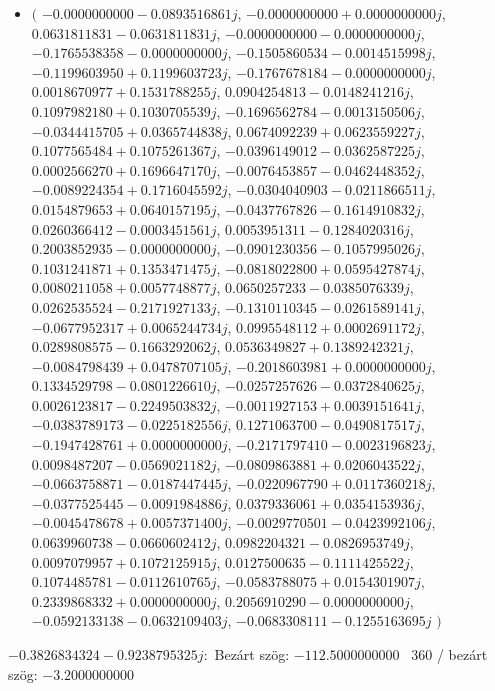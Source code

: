 \documentclass[14pt,a4paper]{article}
\begin{document}
\begin{itemize}
\item
$\big($
$-0.0000000000-0.0893516861j$, $-0.0000000000+0.0000000000j$, $0.0631811831-0.0631811831j$, $-0.0000000000-0.0000000000j$, $-0.1765538358-0.0000000000j$, $-0.1505860534-0.0014515998j$, $-0.1199603950+0.1199603723j$, $-0.1767678184-0.0000000000j$, $0.0018670977+0.1531788255j$, $0.0904254813-0.0148241216j$, $0.1097982180+0.1030705539j$, $-0.1696562784-0.0013150506j$, $-0.0344415705+0.0365744838j$, $0.0674092239+0.0623559227j$, $0.1077565484+0.1075261367j$, $-0.0396149012-0.0362587225j$, $0.0002566270+0.1696647170j$, $-0.0076453857-0.0462448352j$, $-0.0089224354+0.1716045592j$, $-0.0304040903-0.0211866511j$, $0.0154879653+0.0640157195j$, $-0.0437767826-0.1614910832j$, $0.0260366412-0.0003451561j$, $0.0053951311-0.1284020316j$, $0.2003852935-0.0000000000j$, $-0.0901230356-0.1057995026j$, $0.1031241871+0.1353471475j$, $-0.0818022800+0.0595427874j$, $0.0080211058+0.0057748877j$, $0.0650257233-0.0385076339j$, $0.0262535524-0.2171927133j$, $-0.1310110345-0.0261589141j$, $-0.0677952317+0.0065244734j$, $0.0995548112+0.0002691172j$, $0.0289808575-0.1663292062j$, $0.0536349827+0.1389242321j$, $-0.0084798439+0.0478707105j$, $-0.2018603981+0.0000000000j$, $0.1334529798-0.0801226610j$, $-0.0257257626-0.0372840625j$, $0.0026123817-0.2249503832j$, $-0.0011927153+0.0039151641j$, $-0.0383789173-0.0225182556j$, $0.1271063700-0.0490817517j$, $-0.1947428761+0.0000000000j$, $-0.2171797410-0.0023196823j$, $0.0098487207-0.0569021182j$, $-0.0809863881+0.0206043522j$, $-0.0663758871-0.0187447445j$, $-0.0220967790+0.0117360218j$, $-0.0377525445-0.0091984886j$, $0.0379336061+0.0354153936j$, $-0.0045478678+0.0057371400j$, $-0.0029770501-0.0423992106j$, $0.0639960738-0.0660602412j$, $0.0982204321-0.0826953749j$, $0.0097079957+0.1072125915j$, $0.0127500635-0.1111425522j$, $0.1074485781-0.0112610765j$, $-0.0583788075+0.0154301907j$, $0.2339868332+0.0000000000j$, $0.2056910290-0.0000000000j$, $-0.0592133138-0.0632109403j$, $-0.0683308111-0.1255163695j$
$\big)$
\end{itemize}
$-0.3826834324-0.9238795325j$:\
Bezárt szög: $-112.5000000000$ \
360 / bezárt szög: $-3.2000000000$\
\end{document}
